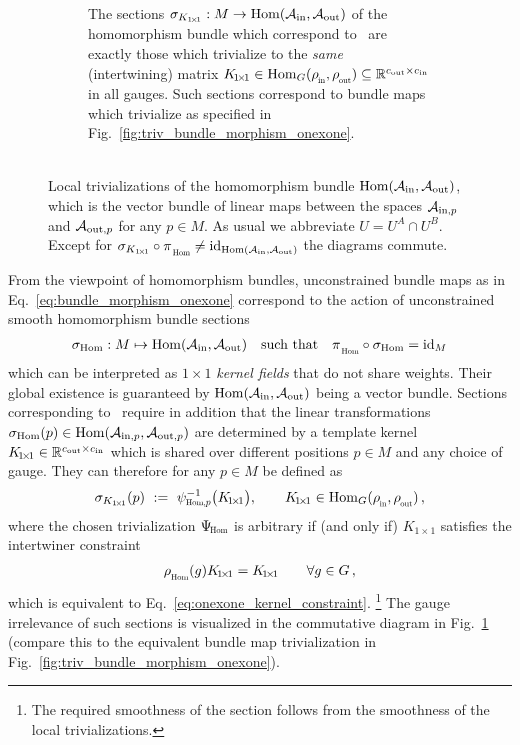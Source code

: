 \begin{figure}
\begin{subfigure}[b]{0.49\textwidth}
        \caption{\small
            The sections $\sigma_{K_{1\!\times\!1}}: M\to \operatorname{Hom}(\mathcal{A}_\textup{in},\mathcal{A}_\textup{out})$ of the homomorphism bundle which correspond to \onexoneGMs\ are exactly those which trivialize to the \emph{same} (intertwining) matrix
            $K_{\!1\!\times\!1} \in \Hom_G(\rhoin,\rhoout) \subseteq \R^{\cout\times\cin}$
            in all gauges.
            Such sections correspond to bundle maps which trivialize as specified in Fig.~\ref{fig:triv_bundle_morphism_onexone}.
            \\~
        }
        \label{fig:trivialization_hom_onexone_section}
    \end{subfigure}
    \caption{\small
        Local trivializations of the homomorphism bundle $\operatorname{Hom}(\mathcal{A}_\textup{in},\mathcal{A}_\textup{out})$, which is the vector bundle of linear maps between the spaces $\mathcal{A}_{\textup{in},p}$ and $\mathcal{A}_{\textup{out},p}$ for any $p\in M$.
        As usual we abbreviate $U=U^A\cap U^B$.
        Except for $\sigma_{K_{1\!\times\!1}} \circ \piHom \neq \id_{\Hom(\Ain,\Aout)}$ the diagrams commute.
    }
    \label{fig:trivializations_hom_bundle}
\end{figure}


From the viewpoint of homomorphism bundles, unconstrained bundle maps as in Eq.~\eqref{eq:bundle_morphism_onexone} correspond to the action of unconstrained smooth homomorphism bundle sections
\begin{align}\label{eq:hom_bdl_section_unconstrained}
    \sigma_{\Hom}:M \mapsto \Hom(\Ain,\Aout)
    \quad \textup{such that} \quad
    \piHom \circ \sigma_{\Hom} = \id_M
\end{align}
which can be interpreted as $1\!\times\!1$ \emph{kernel fields} that do not share weights.
Their global existence is guaranteed by $\operatorname{Hom}(\mathcal{A}_\textup{in},\mathcal{A}_\textup{out})$ being a vector bundle.
Sections corresponding to \onexoneGMsit\ require in addition that the linear transformations $\sigma_{\operatorname{Hom}}(p)\in\operatorname{Hom}(\mathcal{A}_{\textup{in},p},\mathcal{A}_{\textup{out},p})$ are determined by a template kernel $K_{\!1\!\times\!1} \in\mathbb{R}^{{c_\textup{out}}\times{c_\textup{in}}}$ which is shared over different positions $p\in M$ and any choice of gauge.
They can therefore for any $p \in \!M$ be defined as
\begin{align}
    \sigma_{K_{1\!\times\!1}}(p)\ :=\ \psiHomp^{-1}\big(K_{\!1\!\times\!1}\big), \qquad K_{\!1\!\times\!1} \in \Hom_G(\rhoin,\rhoout) \,,
\end{align}
where the chosen trivialization $\PsiHom$ is arbitrary if (and only if) $K_{\!1\!\times\!1}$ satisfies the intertwiner constraint
\begin{align}\label{eq:onexone_intertwiner_constraint_rhoHom}
    \rhoHom(g) K_{\!1\!\times\!1} = K_{\!1\!\times\!1} \qquad\forall g\in G \,,
\end{align}
which is equivalent to Eq.~\eqref{eq:onexone_kernel_constraint}.%
\footnote{
    The required smoothness of the section follows from the smoothness of the local trivializations.
}
The gauge irrelevance of such sections is visualized in the commutative diagram in Fig.~\ref{fig:trivialization_hom_onexone_section} (compare this to the equivalent bundle map trivialization in Fig.~\ref{fig:triv_bundle_morphism_onexone}).



